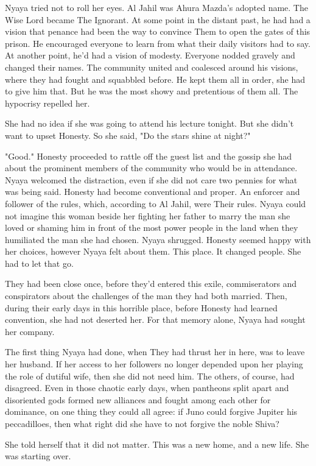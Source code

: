 \documentclass{amsart}
\begin{document}
Nyaya tried not to roll her eyes. Al Jahil was Ahura Mazda's adopted name. The Wise Lord became The Ignorant. At some point in the distant past, he had had a vision that penance had been the way to convince Them to open the gates of this prison. He encouraged everyone to learn from what their daily visitors had to say. At another point, he'd had a vision of modesty. Everyone nodded gravely and changed their names. The community united and coalesced around his visions, where they had fought and squabbled before. He kept them all in order, she had to give him that. But he was the most showy and pretentious of them all. The hypocrisy repelled her. 

She had no idea if she was going to attend his lecture tonight. But she didn't want to upset Honesty. So she said, "Do the stars shine at night?" 

"Good." Honesty proceeded to rattle off the guest list and the gossip she had about the prominent members of the community who would be in attendance. Nyaya welcomed the distraction, even if she did not care two pennies for what was being said. Honesty had become conventional and proper. An enforcer and follower of the rules, which, according to Al Jahil, were Their rules. Nyaya could not imagine this woman beside her fighting her father to marry the man she loved or shaming him in front of the most power people in the land when they humiliated the man she had chosen. Nyaya shrugged. Honesty seemed happy with her choices, however Nyaya felt about them. This place. It changed people. She had to let that go.

They had been close once, before they'd entered this exile, commiserators and conspirators about the challenges of the man they had both married. Then, during their early days in this horrible place, before Honesty had learned convention, she had not deserted her. For that memory alone, Nyaya had sought her company. 

The first thing Nyaya had done, when They had thrust her in here, was to leave her husband. If her access to her followers no longer depended upon her playing the role of dutiful wife, then she did not need him. The others, of course, had disagreed. Even in those chaotic early days, when pantheons split apart and disoriented gods formed new alliances and fought among each other for dominance, on one thing they could all agree: if Juno could forgive Jupiter his peccadilloes, then what right did she have to not forgive the noble Shiva? 

She told herself that it did not matter. This was a new home, and a new life. She was starting over.
\end{document}
